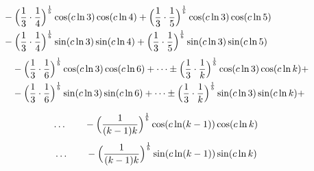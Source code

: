 \documentclass{amsart}
\begin{document}
	\[
	\begin{aligned}
		& -\Bigl( \frac{1}{3} \cdot \frac{1}{4} \Bigr)^\frac1b \cos(c \ln3) \cos(c \ln4) + \Bigl( \frac{1}{3} \cdot \frac{1}{5} \Bigr)^\frac1b \cos(c \ln 3) \cos(c \ln 5) \\
		& -\Bigl( \frac{1}{3} \cdot \frac{1}{4} \Bigr)^\frac1b \sin(c \ln3) \sin(c \ln4) + \Bigl( \frac{1}{3} \cdot \frac{1}{5} \Bigr)^\frac1b \sin(c \ln 3) \sin(c \ln 5)
	\end{aligned}
	\]
	\[
	\begin{aligned}
		\qquad\qquad\quad & -\Bigl( \frac{1}{3} \cdot \frac{1}{6} \Bigr)^\frac1b \cos(c \ln 3) \cos(c \ln 6) + \dots \pm \Bigl( \frac{1}{3} \cdot \frac{1}{k} \Bigr)^\frac1b \cos(c \ln 3) \cos(c \ln k) + \\
		& -\Bigl( \frac{1}{3} \cdot \frac{1}{6} \Bigr)^\frac1b \sin(c \ln 3) \sin(c \ln 6) + \dots \pm \Bigl( \frac{1}{3} \cdot \frac{1}{k} \Bigr)^\frac1b \sin(c \ln 3) \sin(c \ln k) +
	\end{aligned}
	\]
	
	\[ \qquad\qquad \dots \qquad - \Bigl( \frac{1}{(k-1)k} \Bigr)^\frac1b \cos(c \ln (k-1)) \cos(c \ln k) \]
	\[ \qquad\qquad \dots \qquad - \Bigl( \frac{1}{(k-1)k} \Bigr)^\frac1b \sin(c \ln (k-1)) \sin(c \ln k) \]
	
\end{document}
